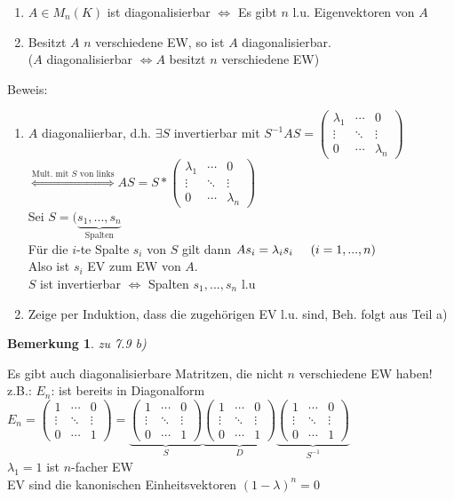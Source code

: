 \documentclass[a4paper,11pt]{article}
\newtheorem{bem}[definition]{Bemerkung}
\begin{document}
\begin{enumerate}[label=\alph*)]
\item $A\in M_n(K)$ ist diagonalisierbar $\Leftrightarrow$ Es gibt $n$ l.u. Eigenvektoren von $A$
\item Besitzt $A$ $n$ verschiedene EW, so ist $A$ diagonalisierbar. \\
($A$ diagonalisierbar $\Leftrightarrow A$ besitzt $n$ verschiedene EW)
\end{enumerate}
Beweis:
\begin{enumerate}[label=\alph*)]
\item $A$ diagonaliierbar, d.h. $\exists S$ invertierbar mit $S^{-1}AS=\begin{pmatrix}\lambda_1&\cdots&0\\\vdots&\ddots&\vdots\\0&\cdots&\lambda_n\end{pmatrix}$ \\ $\overset{\text{Mult. mit $S$ von links}}{\Leftrightarrow} AS=S*\begin{pmatrix}\lambda_1&\cdots&0\\\vdots&\ddots&\vdots\\0&\cdots&\lambda_n\end{pmatrix}$ \\
Sei $S=(\underbrace{s_1,...,s_n}_{\text{Spalten}}$ \\
Für die $i$-te Spalte $s_i$ von $S$ gilt dann $As_i=\lambda_is_i\hspace{5mm}(i=1,...,n)$ \\
Also ist $s_i$ EV zum EW von $A$. \\
$S$ ist invertierbar $\Leftrightarrow$ Spalten $s_1,...,s_n$ l.u \
\item Zeige per Induktion, dass die zugehörigen EV l.u. sind, Beh. folgt aus Teil a)
\end{enumerate}
\begin{bem}
zu 7.9 b)
\end{bem}
Es gibt auch diagonalisierbare Matritzen, die nicht $n$ verschiedene EW haben! \\
z.B.: $E_n$: ist bereits in Diagonalform \\
$E_n=\begin{pmatrix}1&\cdots&0\\\vdots&\ddots&\vdots\\0&\cdots&1\end{pmatrix}=\underbrace{\begin{pmatrix}1&\cdots&0\\\vdots&\ddots&\vdots\\0&\cdots&1\end{pmatrix}}_{S}\underbrace{\begin{pmatrix}1&\cdots&0\\\vdots&\ddots&\vdots\\0&\cdots&1\end{pmatrix}}_{D}\underbrace{\begin{pmatrix}1&\cdots&0\\\vdots&\ddots&\vdots\\0&\cdots&1\end{pmatrix}}_{S^{-1}}$ \\
$\lambda_1=1$ ist $n$-facher EW \\
EV sind die kanonischen Einheitsvektoren $(1-\lambda)^n=0$
\end{document}
